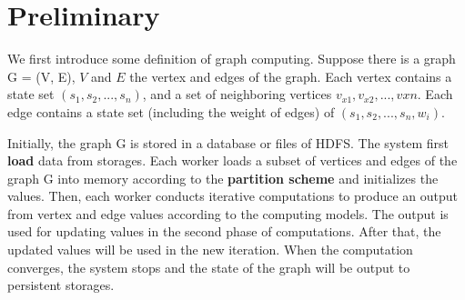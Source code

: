 \section{Preliminary} \label{pre}
We first introduce some definition of graph computing.
Suppose there is a graph G = (V, E), $V$ and $E$ the vertex
and edges of the graph. Each vertex contains a state set $(s_1, s_2, ..., s_n)$,
and a set of neighboring vertices $v_{x1}, v_{x2}, ..., v{xn}$.
Each edge contains a state set (including the weight of edges) of
$(s_1, s_2, ..., s_n, w_i)$.

Initially, the graph G is stored in a database or files of HDFS. The system
first \textbf{load} data from storages. Each worker loads a subset of vertices
and edges of the graph G into memory according to the \textbf{partition scheme}
and initializes the values.
Then, each worker conducts iterative computations to
produce an output from vertex and edge values
according to the computing models. The output is used for updating
values in the second phase of computations. After that, the updated values
will be used in the new iteration.
When the computation converges, the system stops and the state of the graph
will be output to persistent storages.

